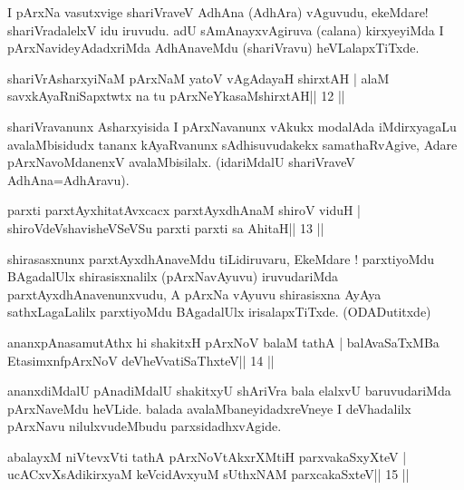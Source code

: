 \begin{artha}
I pArxNa vasutxvige shariVraveV AdhAna (AdhAra) vAguvudu, ekeMdare! shariVradalelxV idu iruvudu. adU sAmAnayxvAgiruva (calana) kirxyeyiMda I pArxNavideyAdadxriMda AdhAnaveMdu (shariVravu) heVLalapxTiTxde.
\end{artha}

\begin{shl}
shariVrAsharxyiNaM pArxNaM yatoV vAgAdayaH shirxtAH |
alaM savxkAyaRniSapxtwtx na tu pArxNeYkasaMshirxtAH\hfill || 12 ||
\end{shl}

\begin{artha}
shariVravanunx Asharxyisida I pArxNavanunx vAkukx modalAda iMdirxyagaLu avalaMbisidudx tananx kAyaRvanunx sAdhisuvudakekx samathaRvAgive, Adare pArxNavoMdanenxV avalaMbisilalx. (idariMdalU shariVraveV AdhAna=AdhAravu).
\end{artha}



\begin{shl}
parxti parxtAyxhitatAvxcacx parxtAyxdhAnaM shiroV viduH |
shiroVdeVshavisheVSeVSu parxti parxti sa AhitaH\hfill || 13 ||
\end{shl}

\begin{artha}
shirasasxnunx parxtAyxdhAnaveMdu tiLidiruvaru, EkeMdare ! parxtiyoMdu
BAgadalUlx shirasisxnalilx (pArxNavAyuvu) iruvudariMda
parxtAyxdhAnavenunxvudu, A pArxNa vAyuvu shirasisxna AyAya
sathxLagaLalilx parxtiyoMdu BAgadalUlx irisalapxTiTxde. (ODADutitxde)
\end{artha}



\begin{shl}
ananxpAnasamutAthx hi shakitxH pArxNoV balaM tathA |
balAvaSaTxMBa EtasimxnfpArxNoV deVheV\s vatiSaThxteV\hfill || 14 ||
\end{shl}

\begin{artha}
ananxdiMdalU pAnadiMdalU shakitxyU shAriVra bala elalxvU baruvudariMda pArxNaveMdu heVLide. balada avalaMbaneyidadxreVneye I deVhadalilx pArxNavu nilulxvudeMbudu parxsidadhxvAgide.
\end{artha}



\begin{shl}
abalayxM niVtevxVti tathA pArxNoVtAkxrXMtiH parxvakaSxyXteV |
ucACxvXsAdikirxyaM keVcidAvxyuM sUthxNAM parxcakaSxteV\hfill || 15 ||
\end{shl}

